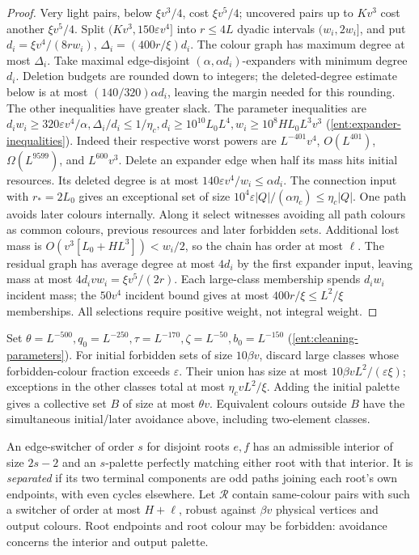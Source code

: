 \begin{proof}
Very light pairs, below $\xi{}v^3/4$, cost $\xi{}v^5/4$; uncovered pairs up to $Kv^3$ cost another $\xi{}v^5/4$. Split $(Kv^3,150\varepsilon{}v^4]$ into $r\le4L$ dyadic intervals $(w_i,2w_i]$, and put $d_i=\xi{}v^4/(8rw_i)$, $\Delta_i=(400r/\xi)d_i$. The colour graph has maximum degree at most $\Delta_i$. Take maximal edge-disjoint $(\alpha,\alpha{}d_i)$-expanders with minimum degree $d_i$. Deletion budgets are rounded down to integers; the deleted-degree
estimate below is at most $(140/320)\alpha{}d_i$, leaving the margin needed for this rounding. The other inequalities have greater slack.
The parameter inequalities are \label{ent:expander-inequalities}$d_iw_i\ge320\varepsilon{}v^4/\alpha,\Delta_i/d_i\le1/\eta_c,d_i\ge10^{10}L_0L^4,w_i\ge10^8HL_0L^3v^3$ \textup{(\ref{ent:expander-inequalities})}. Indeed their respective worst powers are $L^{-401}v^4$, $O(L^{401})$, $\Omega(L^{9599})$, and $L^{600}v^3$. Delete an expander edge when half its mass hits initial resources.
Its deleted degree is at most $140\varepsilon{}v^4/w_i\le\alpha{}d_i$. The connection input with $r_*=2L_0$ gives an exceptional set of size $10^4\varepsilon|Q|/(\alpha\eta_c)\le\eta_c|Q|$. One path avoids later colours internally. Along it select witnesses
avoiding all path colours as common colours, previous resources and
later forbidden sets. Additional lost mass is $O(v^3[L_0+HL^3])<w_i/2$, so the chain has order at most $\ell$. The residual graph has average degree at most $4d_i$ by the first expander input, leaving mass at most $4d_ivw_i=\xi{}v^5/(2r)$. Each large-class membership spends $d_iw_i$ incident mass; the $50v^4$ incident bound gives at most $400r/\xi\le{}L^2/\xi$ memberships. All selections require positive weight, not integral weight.
\end{proof}

Set \label{ent:cleaning-parameters}$\theta=L^{-500},q_0=L^{-250},\tau=L^{-170},\zeta=L^{-50},b_0=L^{-150}$ \textup{(\ref{ent:cleaning-parameters})}. For initial forbidden sets of size $10\beta{}v$, discard large classes whose forbidden-colour fraction exceeds $\varepsilon$. Their union has size at most $10\beta{}vL^2/(\varepsilon\xi)$; exceptions in the other classes total at most $\eta_cvL^2/\xi$. Adding the initial palette gives a collective set $B$ of size at most $\theta{}v$. Equivalent colours outside $B$ have the simultaneous initial/later avoidance above, including two-element classes.

An edge-switcher of order $s$ for disjoint roots $e,f$ has an admissible interior of size $2s-2$ and an $s$-palette perfectly matching either root with that interior. It is \emph{separated}
if its two terminal components are odd paths joining each root's
own endpoints, with even cycles elsewhere. Let $\mathcal{R}$ contain same-colour pairs with such a switcher of order at most $H+\ell$, robust against $\beta{}v$ physical vertices and output colours. Root endpoints and root colour may be forbidden: avoidance concerns
the interior and output palette.

